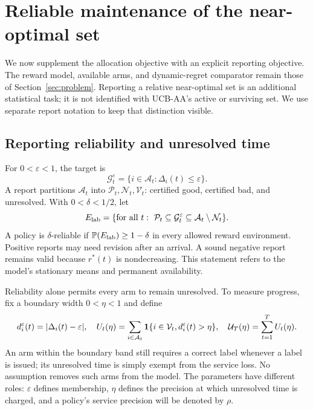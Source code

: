 \documentclass[11pt]{article}
\begin{document}
\section{Reliable maintenance of the near-optimal set}
\label{sec:reporting_task}

We now supplement the allocation objective with an explicit reporting
objective. The reward model, available arms, and dynamic-regret comparator
remain those of Section~\ref{sec:problem}. Reporting a relative near-optimal
set is an additional statistical task; it is not identified with UCB-AA's
active or surviving set. We use separate report notation to keep that
distinction visible.

\subsection{Reporting reliability and unresolved time}

For $0<\varepsilon<1$, the target is
\[
 \mathcal G_t^\varepsilon=\{i\in \mathcal{A}_t:\Delta_i(t)\le\varepsilon\}.
\]
A report partitions $\mathcal{A}_t$ into $\mathcal P_t,\mathcal N_t,\mathcal V_t$: certified good, certified bad,
and unresolved. With $0<\delta<1/2$, let
\[
 E_{\rm lab}=\{\text{for all }t:\ \mathcal P_t\subseteq \mathcal G_t^\varepsilon
                                  \subseteq \mathcal{A}_t\setminus \mathcal N_t\}.
\]
A policy is $\delta$-reliable if $\mathbb P(E_{\rm lab})\ge1-\delta$ in every
allowed reward environment. Positive reports may need revision after an
arrival. A sound negative report remains valid because $r^*(t)$ is nondecreasing.
This statement refers to the model's stationary means and permanent availability.

Reliability alone permits every arm to remain unresolved. To measure progress,
fix a boundary width $0<\eta<1$ and define
\begin{equation}
 d_i^\varepsilon(t)=|\Delta_i(t)-\varepsilon|,\quad
 U_t(\eta)=\sum_{i\in \mathcal{A}_t}\mathbf 1\{i\in \mathcal V_t,d_i^\varepsilon(t)>\eta\},\quad
 \mathcal U_T(\eta)=\sum_{t=1}^TU_t(\eta).
 \label{eq:area}
\end{equation}
An arm within the boundary band still requires a correct label whenever a
label is issued; its unresolved time is simply exempt from the service loss.
No assumption removes such arms from the model. The parameters have different
roles: $\varepsilon$ defines membership, $\eta$ defines the precision at which
unresolved time is charged, and a policy's service precision will be denoted
by $\rho$.
\end{document}
